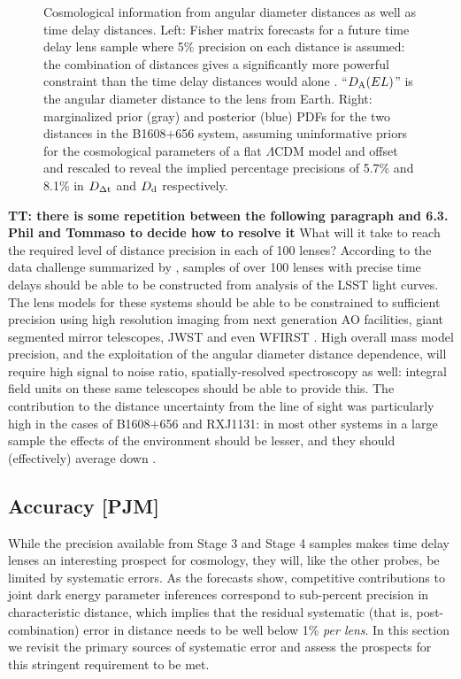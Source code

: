 \begin{figure}[!t]
\begin{minipage}{0.48\linewidth}
\end{minipage}
\caption{Cosmological information from angular diameter distances
as well as time delay distances. Left: Fisher matrix
forecasts for a future time delay lens sample where 5\% precision on
each distance is assumed: the combination of distances gives a
significantly more powerful constraint than the time delay distances
would alone \citep[reproduced from][]{JeeEtal2016}. ``$D_{\rm A}(EL)$'' is
the angular diameter distance to the lens from Earth. Right: marginalized
prior (gray) and posterior (blue) PDFs for the two
distances in the B1608$+$656 system, assuming uninformative priors for the
cosmological parameters of a flat $\Lambda$CDM model and offset and
rescaled to reveal the implied percentage precisions of 5.7\% and 8.1\%
in $D_{\Delta{\rm t}}$ and $D_{\rm d}$ respectively. }
\label{fig:DdDdt}
\end{figure}


{\bf TT: there is some repetition between the following paragraph and 6.3. Phil and Tommaso to decide how to resolve it}
What will it take to reach the required level of distance precision in
each of 100 lenses?  According to the data challenge summarized by
\citet{LiaoEtal2015}, samples of over 100 lenses with
precise time delays should be able to be constructed from analysis of
the LSST light curves. The lens models for these systems should be
able to be constrained to sufficient precision using high resolution
imaging from next generation AO facilities, giant segmented mirror
telescopes, JWST and even WFIRST \citep{Men++15}. High overall mass
model precision, and the exploitation of the angular diameter distance
dependence, will require high signal to noise ratio,
spatially-resolved spectroscopy as well: integral field units on these
same telescopes should be able to provide this. The contribution to
the distance uncertainty from the line of sight was particularly high
in the cases of B1608$+$656 and RXJ1131: in most other systems in a
large sample the effects of the environment should be lesser, and they
should (effectively) average down \citep{ColletEtal13}. 



\subsection{Accuracy [PJM]}
\label{ssec:accuracy}

While the precision available from Stage 3 and Stage 4 samples makes
time delay lenses an interesting prospect for cosmology, they will, like
the other probes, be limited by systematic errors. As the forecasts
show, competitive contributions to joint dark energy parameter
inferences correspond to sub-percent precision in characteristic
distance, which implies that the residual systematic (that is,
post-combination) error in  distance needs to be well below 1\% {\it per
lens}. In this section we revisit the primary sources of systematic
error and  assess the prospects for this stringent requirement to be
met.


